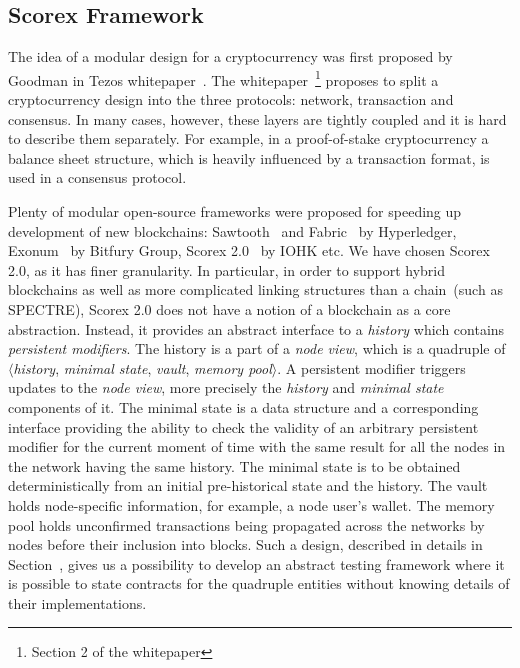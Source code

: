 
\subsection{Scorex Framework}

The idea of a modular design for a cryptocurrency was first proposed by Goodman in Tezos whitepaper~\cite{goodmantezos}. The whitepaper~\footnote{Section 2 of the whitepaper} proposes to split a cryptocurrency design into the three protocols: network, transaction and consensus. In many cases, however, these layers are tightly coupled and it is hard to describe them separately. For example, in a proof-of-stake cryptocurrency a balance sheet structure, which is heavily influenced by a transaction format, is used in a consensus protocol. 

Plenty of modular open-source frameworks were proposed for speeding up development of new blockchains: Sawtooth~\cite{sawtooth} and Fabric~\cite{fabric} by Hyperledger, Exonum~\cite{exonum} by Bitfury Group, Scorex 2.0~\cite{scorex} by IOHK etc. We have chosen Scorex 2.0, as it has finer granularity. In particular, in order to support hybrid blockchains as well as more complicated linking structures than a chain~(such as SPECTRE\cite{EPRINT:SomLewZoh16}), Scorex 2.0 does not have a notion of a blockchain as a core abstraction. Instead, it provides an abstract interface to a \textit{history} which contains \textit{persistent modifiers}. The history is a part of a \textit{node view}, which is a quadruple of $\langle$\textit{history}, \textit{minimal state}, \textit{vault}, \textit{memory pool}$\rangle$. A persistent modifier triggers updates to the \textit{node view}, more precisely the \textit{history} and \textit{minimal state} components of it. The minimal state is a data structure and a corresponding interface providing the ability to check the validity of an arbitrary persistent modifier for the current moment of time with the same result for all the nodes in the network having the same history. The minimal state is to be obtained deterministically from an initial pre-historical state and the history. The vault holds node-specific information, for example, a node user's wallet. The memory pool holds unconfirmed transactions being propagated across the networks by nodes before their inclusion into blocks. Such a design, described in details in Section~, gives us a possibility to develop an abstract testing framework where it is possible to state contracts for the quadruple entities without knowing details of their implementations.